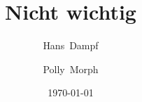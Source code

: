 \documentclass[a4paper]{report}
\begin{document}
    \title{Nicht wichtig}
    \author{Hans~Dampf \and Polly~Morph}
    \date{\today}
    \maketitle
\end{document}
